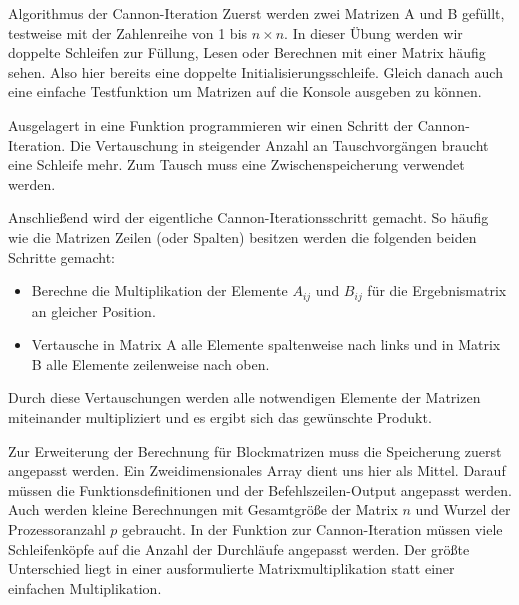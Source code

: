 \documentclass[
ngerman,
subtask=ruled %
]{tudaexercise}
\begin{document}
	
	\begin{task}{Algorithmus der Cannon-Iteration}\label{task:1}
		Zuerst werden zwei Matrizen A und B gefüllt, testweise mit der Zahlenreihe von 1 bis $n \times n$.
		In dieser Übung werden wir doppelte Schleifen zur Füllung, Lesen oder Berechnen mit einer Matrix häufig sehen.
		Also hier bereits eine doppelte Initialisierungsschleife. Gleich danach auch eine einfache Testfunktion um Matrizen auf die Konsole ausgeben zu können.
		
		Ausgelagert in eine Funktion programmieren wir einen Schritt der Cannon-Iteration.
		Die Vertauschung in steigender Anzahl an Tauschvorgängen braucht eine Schleife mehr. Zum Tausch muss eine Zwischenspeicherung verwendet werden.
		
		Anschließend wird der eigentliche Cannon-Iterationsschritt gemacht. So häufig wie die Matrizen Zeilen (oder Spalten) besitzen werden die folgenden beiden Schritte gemacht:
		\begin{itemize}
			\item Berechne die Multiplikation der Elemente $A_{ij}$ und $B_{ij}$ für die Ergebnismatrix an gleicher Position.
			\item Vertausche in Matrix A alle Elemente spaltenweise nach links und in Matrix B alle Elemente zeilenweise nach oben.
		\end{itemize}
		Durch diese Vertauschungen werden alle notwendigen Elemente der Matrizen miteinander multipliziert und es ergibt sich das gewünschte Produkt.
		
		Zur Erweiterung der Berechnung für Blockmatrizen muss die Speicherung zuerst angepasst werden. Ein Zweidimensionales Array dient uns hier als Mittel. Darauf müssen die Funktionsdefinitionen und der Befehlszeilen-Output angepasst werden.
		Auch werden kleine Berechnungen mit Gesamtgröße der Matrix $n$ und Wurzel der Prozessoranzahl $p$ gebraucht.
		In der Funktion zur Cannon-Iteration müssen viele Schleifenköpfe auf die Anzahl der Durchläufe angepasst werden.
		Der größte Unterschied liegt in einer ausformulierte Matrixmultiplikation statt einer einfachen Multiplikation.
	\end{task}
	
\end{document}

